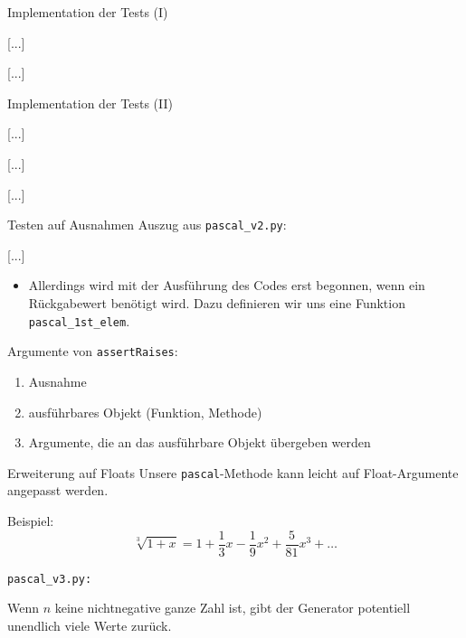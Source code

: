 \documentclass[t, utf8x, 10pt]{beamer}
\begin{document}
\begin{frame}{Implementation der Tests (I)}
 \begin{small}
  [...]
  
  [...]
  
  [...]
 \end{small}
\end{frame}


\begin{frame}{Implementation der Tests (II)}
 \begin{small}
  
  [...]
  
  [...]
  
  [...]
 \end{small}
\end{frame}


\begin{frame}{Testen auf Ausnahmen}
 Auszug aus \texttt{pascal\_v2.py}:
 \begin{footnotesize}
  
 \end{footnotesize}
 [...]

 \begin{itemize}
  \item Allerdings wird mit der Ausführung des Codes erst begonnen, wenn
	ein Rückgabewert benötigt wird. Dazu definieren wir uns eine
	Funktion \texttt{pascal\_1st\_elem}.
 \end{itemize}

 \begin{footnotesize}
  
 \end{footnotesize}

 Argumente von \texttt{assertRaises}:
 \begin{enumerate}
  \item Ausnahme
  \item ausführbares Objekt (Funktion, Methode)
  \item Argumente, die an das ausführbare Objekt übergeben werden
 \end{enumerate}
\end{frame}


\begin{frame}{Erweiterung auf Floats}
 Unsere \texttt{pascal}-Methode kann leicht auf Float-Argumente angepasst werden.
 
 Beispiel:
 \begin{displaymath}
  \sqrt[3]{1+x} = 1+\frac{1}{3}x-\frac{1}{9}x^2+\frac{5}{81}x^3+\ldots
 \end{displaymath}

 \texttt{pascal\_v3.py:}
 

 Wenn $n$ keine nichtnegative ganze Zahl ist, gibt der Generator potentiell unendlich
 viele Werte zurück.
\end{frame}
\end{document}
